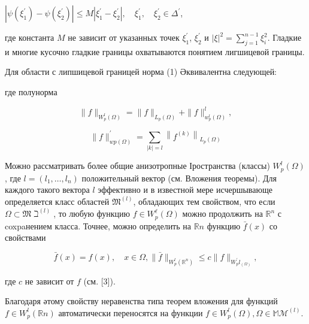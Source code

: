 \documentclass[10pt]{article}
\begin{document}
$\left|\psi\left(\xi_{1}^{\prime}\right)-\psi\left(\xi_{2}^{\prime}\right)\right| \leqslant M\left|\xi_{1}^{\prime}-\xi_{2}^{\prime}\right|, \quad \xi_{1}^{\prime}, \quad \xi_{2}^{\prime} \in \Delta^{\prime}$,



где константа $M$ не зависит от указанных точек $\xi_{1}^{\prime}$, $\xi_{2}^{\prime}$ и $|\xi|^{2}=\sum_{j=1}^{n-1} \xi_{i}^{2}$. Гладкие и многие кусочно гладкие границы охватываются понятием лигшицевой границы.



Для области с липшицевой границей норма (1) Әквивалентна следующей:



где полунорма



\[

\|f\|_{W_{p}^{l}(\Omega)}=\|f\|_{L_{p}(\Omega)}+\|f\|_{w_{p}^{l}(\Omega)}^{l},

\]



\[

\|f\|_{w p(\Omega)}^{\prime}=\sum_{|k|=l}\left\|f^{(k)}\right\|_{L_{p}(\Omega)}

\]



Можно рассматривать более общие анизотропные Іространства (классы) $W_{p}^{l}(\Omega)$, где $l=\left(l_{1}, \ldots, l_{n}\right)$ положительный вектор (см. Вложения теоремы). Для каждого такого вектора $l$ эффективно и в известной мере исчершывающе определяется класс областей $\mathfrak{M}^{(l)}$, обладающих тем свойством, что если $\Omega \subset \mathfrak{M} \beth^{(l)}$, то любую функцию $f \in W_{p}^{\ell}(\Omega)$ можно продолжить на $\mathbb{R}^{n}$ с coxpaнением класса. Точнее, можно определить на $\mathbb{R} n$ функцию $\bar{f}(x)$ со свойствами



\[

\bar{f}(x)=f(x), \quad x \in \Omega,\|\bar{f}\|_{W_{p}^{l}\left(\mathbb{R}^{n}\right)} \leqslant c\|f\|_{W_{p}^{\prime} l_{(\Omega)}},

\]



где $c$ не зависит от $f$ (см. [3]).



Благодаря әтому свойству неравенства типа теорем вложения для функций $f \in W_{p}^{l}(\mathbb{R} n)$ автоматически переносятся на функции $f \in W_{p}^{l}(\Omega), \Omega \in \mathbb{M} \mathcal{M}^{(l)}$.
\end{document}
